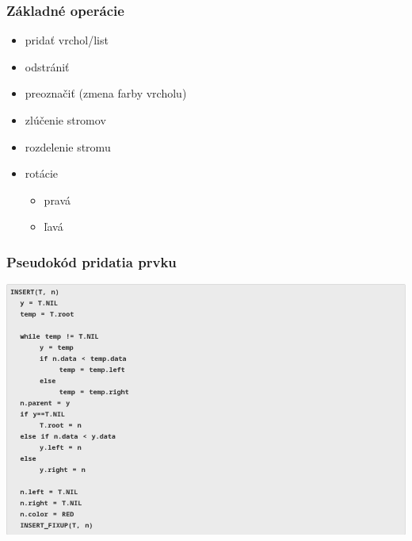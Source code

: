 \documentclass{beamer}
\begin{document}
    \begin{frame}
        \frametitle{Základné operácie}
        \begin{itemize}
            \item pridať vrchol/list
            \item odstrániť
            \item preoznačiť {\footnotesize{(zmena farby vrcholu)}}
            \item zlúčenie stromov
            \item rozdelenie stromu
            \item rotácie
            \begin{itemize}
                \item pravá
                \item ľavá
            \end{itemize}
        \end{itemize}
    \end{frame}

    \begin{frame}
        \frametitle{Pseudokód pridatia prvku}
        \includegraphics[width=\textwidth]{in}
    \end{frame}
\end{document}
